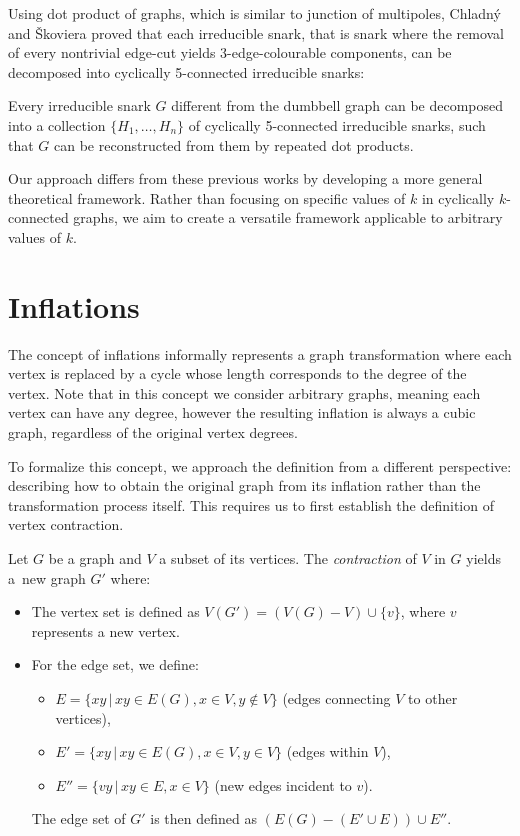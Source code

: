 \documentclass[12pt, twoside]{book}
\begin{document}
Using dot product of graphs, which is similar to junction of multipoles, Chladný and Škoviera \cite{Chladny2010} proved that each irreducible snark, that is snark where the removal of every nontrivial edge-cut yields 3-edge-colourable components, can be decomposed into cyclically 5-connected irreducible snarks:

\begin{theorem}
	Every irreducible snark $G$ different from the dumbbell graph can be decomposed into a collection $\{H_1, \dots , H_n\}$ of cyclically 5-connected irreducible snarks, such that $G$ can be reconstructed from them by repeated dot products.
\end{theorem}

Our approach differs from these previous works by developing a more general theoretical framework. Rather than focusing on specific values of $k$ in cyclically \mbox{$k$-connected} graphs, we aim to create a versatile framework applicable to arbitrary values of $k$.

\section{Inflations}\label{sec:inflations}

The concept of inflations informally represents a graph transformation where each vertex is replaced by a cycle whose length corresponds to the degree of the vertex. Note that in this concept we consider arbitrary graphs, meaning each vertex can have any degree, however the resulting inflation is always a cubic graph, regardless of the original vertex degrees.

To formalize this concept, we approach the definition from a different perspective: describing how to obtain the original graph from its inflation rather than the transformation process itself. This requires us to first establish the definition of vertex contraction.

Let $G$ be a graph and $V$ a subset of its vertices. The \textit{contraction} of $V$ in $G$ yields a~new graph $G'$ where:
\begin{itemize}
	\item The vertex set is defined as $V(G') = (V(G)-V)\cup \{v\}$, where $v$ represents a new vertex.
	\item For the edge set, we define:
	\begin{itemize}
		\item $E=\{xy\,|\,xy\in E(G), x\in V, y\notin V\}$ (edges connecting $V$ to other vertices),
		\item $E'=\{xy\,|\,xy\in E(G), x\in V, y\in V\}$ (edges within $V$),
		\item $E''=\{vy\,|\, xy\in E, x\in V\}$ (new edges incident to $v$).
	\end{itemize}
	
	The edge set of $G'$ is then defined as ${\left(E(G)-\left(E'\cup E\right)\right)\cup E''}$.
\end{itemize}
\end{document}
